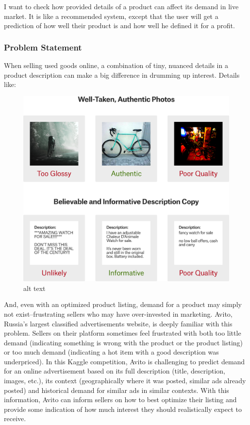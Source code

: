 \documentclass[11pt]{article}
\makeatletter
\def\maxwidth{\ifdim\Gin@nat@width>\linewidth\linewidth
    \else\Gin@nat@width\fi}
\let\Oldincludegraphics\includegraphics
\renewcommand{\includegraphics}[1]{\Oldincludegraphics[width=.8\maxwidth]{#1}}
\makeatother
\begin{document}
I want to check how provided details of a product can affect its demand
in live market. It is like a recommended system, except that the user
will get a prediction of how well their product is and how well he
defined it for a profit.

    \subsubsection{Problem Statement}\label{problem-statement}

    When selling used goods online, a combination of tiny, nuanced details
in a product description can make a big difference in drumming up
interest. Details like:

\begin{figure}
\centering
\includegraphics{./statement.png}
\caption{alt text}
\end{figure}

And, even with an optimized product listing, demand for a product may
simply not exist--frustrating sellers who may have over-invested in
marketing. Avito, Russia's largest classified advertisements website, is
deeply familiar with this problem. Sellers on their platform sometimes
feel frustrated with both too little demand (indicating something is
wrong with the product or the product listing) or too much demand
(indicating a hot item with a good description was underpriced). In this
Kaggle competition, Avito is challenging to predict demand for an online
advertisement based on its full description (title, description, images,
etc.), its context (geographically where it was posted, similar ads
already posted) and historical demand for similar ads in similar
contexts. With this information, Avito can inform sellers on how to best
optimize their listing and provide some indication of how much interest
they should realistically expect to receive.
\end{document}

